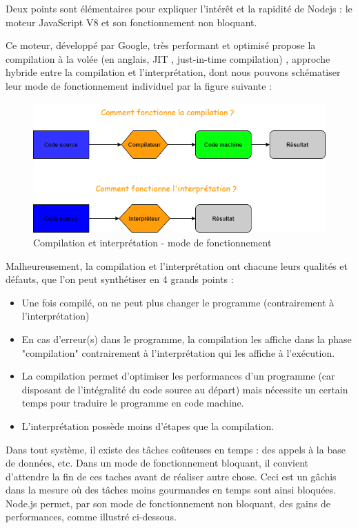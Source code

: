Deux points sont élémentaires pour expliquer l'intérêt et la rapidité de Nodejs : le moteur JavaScript V8 et son fonctionnement non bloquant. \\

\pagebreak

Ce moteur, développé par Google, très performant et optimisé propose la compilation à la volée (en anglais, JIT , just-in-time compilation) , approche hybride entre la compilation et l'interprétation, dont nous pouvons schématiser leur mode de fonctionnement individuel par la figure suivante :
\begin{figure}[H]
    \includegraphics[width=\textwidth,height=0.25\textheight,keepaspectratio]{images/choixTechnologiques/compilationVSinterpretation.png}
    \centering
    \caption{Compilation et interprétation - mode de fonctionnement}
\end{figure}

Malheureusement, la compilation et l'interprétation ont chacune leurs qualités et défauts, que l'on peut synthétiser en 4 grands points :
\begin{itemize}
    \item Une fois compilé, on ne peut plus changer le programme (contrairement à l'interprétation)
    \item En cas d'erreur(s) dans le programme, la compilation les affiche dans la phase "compilation" contrairement à l'interprétation qui les affiche à l'exécution. 
    \item La compilation permet d'optimiser les performances d'un programme (car disposant de l'intégralité du code source au départ) mais nécessite un certain temps pour traduire le programme en code machine.
    \item L'interprétation possède moins d'étapes que la compilation.
\end{itemize}

Dans tout système, il existe des tâches coûteuses en temps : des appels à la base de données, etc.
Dans un mode de fonctionnement bloquant, il convient d'attendre la fin de ces taches avant de réaliser autre chose. Ceci est un gâchis dans la mesure où des tâches moins gourmandes en temps sont ainsi bloquées. Node.js permet, par son mode de fonctionnement non bloquant, des gains de performances, comme illustré ci-dessous.

